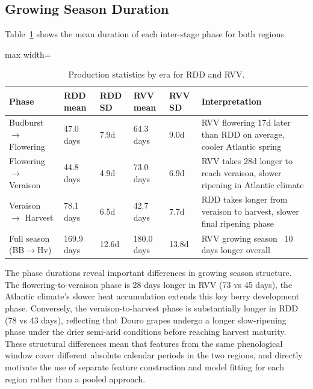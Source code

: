 \subsection{Growing Season Duration}\label{app_sub:growing_season_duration}

Table~\ref{tab:appb_4} shows the mean duration of each inter-stage phase for both regions.

\begin{table}[htbp]
  \centering
  \caption{Production statistics by era for RDD and RVV.}\label{tab:appb_4}
  \footnotesize
  \begin{adjustbox}{max width=\textwidth}
    \begin{tabularx}{\textwidth}{p{2.0cm}|p{2.2cm}|p{1.5cm}|p{1.8cm}|p{1.5cm}|X}
  \toprule
  Phase & RDD mean & RDD SD & RVV mean & RVV SD & Interpretation \\
  \midrule
  Budburst $\rightarrow$ Flowering & 47.0 days & 7.9d & 64.3 days & 9.0d & RVV flowering 17d later than RDD on average, cooler Atlantic spring \\
  Flowering $\rightarrow$ Veraison & 44.8 days & 4.9d & 73.0 days & 6.9d & RVV takes 28d longer to reach veraison, slower ripening in Atlantic climate \\
  Veraison $\rightarrow$ Harvest & 78.1 days & 6.5d & 42.7 days & 7.7d & RDD takes longer from veraison to harvest, slower final ripening phase \\
  Full season (BB$\rightarrow$Hv) & 169.9 days & 12.6d & 180.0 days & 13.8d & RVV growing season ~10 days longer overall \\
  \bottomrule
  \end{tabularx}
  \end{adjustbox}

\end{table}


The phase durations reveal important differences in growing season structure. The flowering-to-veraison phase is 28 days longer in RVV (73 vs 45 days), the Atlantic climate's slower heat accumulation extends this key berry development phase. Conversely, the veraison-to-harvest phase is substantially longer in RDD (78 vs 43 days), reflecting that Douro grapes undergo a longer slow-ripening phase under the drier semi-arid conditions before reaching harvest maturity. These structural differences mean that features from the same phenological window cover different absolute calendar periods in the two regions, and directly motivate the use of separate feature construction and model fitting for each region rather than a pooled approach.



